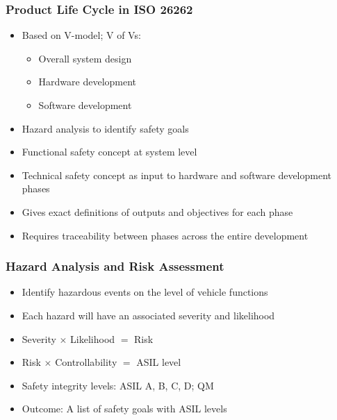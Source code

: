 \documentclass[aspectratio=169]{beamer}
\newif\iftransitions
\newcommand{\cpause}{\iftransitions \pause \fi}
\begin{document}
\begin{frame}
  \frametitle{Product Life Cycle in ISO 26262}
  
  \begin{itemize}
  \item Based on V-model; V of Vs:
  \begin{itemize}
    \item Overall system design
    \item Hardware development 
    \item Software development
  \end{itemize} \cpause
  \item Hazard analysis to identify safety goals   \cpause
  \item Functional safety concept at system level   \cpause
  \item Technical safety concept as input to hardware and software development phases   \cpause
  \item Gives exact definitions of outputs and objectives for each phase   \cpause
  \item Requires traceability between phases across the entire development
  \end{itemize}
\end{frame}

\begin{frame}
  \frametitle{Hazard Analysis and Risk Assessment}
  
  \begin{itemize}
  \item Identify hazardous events on the level of vehicle functions \cpause
  \item Each hazard will have an associated severity and likelihood \cpause
  \item Severity $\times$ Likelihood $=$ Risk \cpause
  \item Risk $\times$ Controllability $=$ ASIL level \cpause
  \item Safety integrity levels: ASIL A, B, C, D; QM \cpause
  \item Outcome: A list of safety goals with ASIL levels
  \end{itemize}
  
\end{frame}
\end{document}

